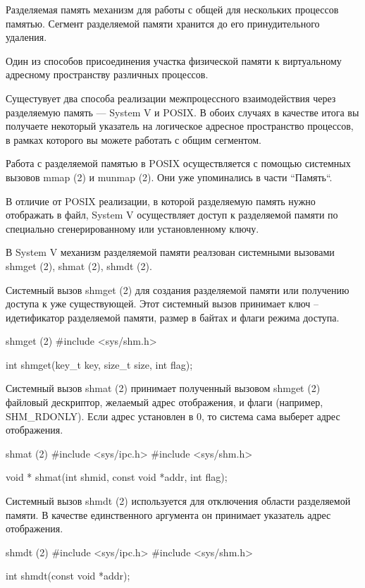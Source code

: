 \begin{defi}{Разделяемая память}
	механизм для работы с общей для нескольких процессов памятью. Сегмент разделяемой памяти хранится до его принудительного удаления.
\end{defi}

Один из способов присоединения участка физической памяти к виртуальному адресному пространству различных процессов.
	
Сущестувует два способа реализации межпроцессного взаимодействия через разделяемую память --- System V и POSIX. В обоих случаях в качестве итога вы получаете некоторый указатель на логическое адресное пространство процессов, в рамках которого вы можете работать с общим сегментом.

Работа с разделяемой памятью в POSIX осуществляется с помощью системных вызовов mmap (2) и munmap (2). Они уже упоминались в части “Память“.

В отличие от POSIX реализации, в которой разделяемую память нужно отображать в файл, System V осуществляет доступ к разделяемой памяти по специально сгенерированному или установленному ключу.

В System V механизм разделяемой памяти реалзован системными вызовами shmget (2), shmat (2), shmdt (2).

Системный вызов shmget (2) для создания разделяемой памяти или получению доступа к уже существующей. Этот системный вызов принимает ключ -- идетификатор разделяемой памяти, размер в байтах и флаги режима доступа.

\begin{CCode}{shmget (2)}
	#include <sys/shm.h>

	int shmget(key_t key, size_t size, int flag); \end{CCode}

Системный вызов shmat (2) принимает полученный вызовом shmget (2) файловый дескриптор, желаемый адрес отображения, и флаги (например, SHM\_RDONLY). Если адрес установлен в 0, то система сама выберет адрес отображения. 

\begin{CCode}{shmat (2)}
	#include <sys/ipc.h>
	#include <sys/shm.h>

	void * shmat(int shmid, const void *addr, int flag); \end{CCode}

Системный вызов shmdt (2) используется для отключения области разделяемой памяти. В качестве единственного аргумента он принимает указатель адрес отображения.

\begin{CCode}{shmdt (2)}
	#include <sys/ipc.h>
	#include <sys/shm.h>

	int shmdt(const void *addr); \end{CCode}